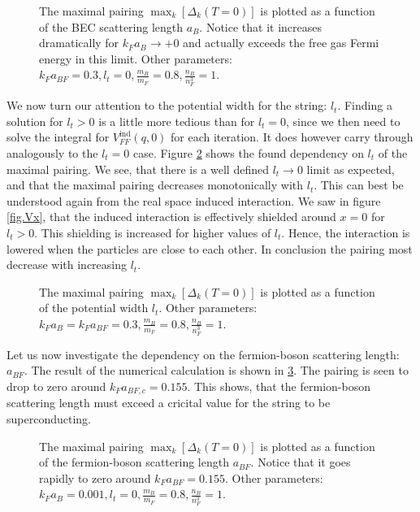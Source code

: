 \begin{figure} 
\begin{center}  
  
\caption{The maximal pairing $\max_k[\Delta_k(T=0)]$ is plotted as a function of the BEC scattering length $a_B$. Notice that it increases dramatically for $k_Fa_B \to +0$ and actually exceeds the free gas Fermi energy in this limit. Other parameters: $k_F a_{BF} = 0.3, l_t = 0, \frac{m_B}{m_F} = 0.8, \frac{n_B}{n_F^3} = 1$.}  
\label{fig.maxkDeltakaBdepend}  
\end{center}    
\end{figure}


 We now turn our attention to the potential width for the string: $l_t$. Finding a solution for $l_t > 0$ is a little more tedious than for $l_t = 0$, since we then need to solve the integral for $V_{FF}^\text{ind}(q,0)$ for each iteration. It does however carry through analogously to the $l_t = 0$ case. Figure \ref{fig.maxkDeltakltdepend} shows the found dependency on $l_t$ of the maximal pairing. We see, that there is a well defined $l_t \to 0$ limit as expected, and that the maximal pairing decreases monotonically with $l_t$. This can best be understood again from the real space induced interaction. We saw in figure \ref{fig.Vx}, that the induced interaction is effectively shielded around $x = 0$ for $l_t > 0$. This shielding is increased for higher values of $l_t$. Hence, the interaction is lowered when the particles are close to each other. In conclusion the pairing most decrease with increasing $l_t$. 

\begin{figure} 
\begin{center}  
  
\caption{The maximal pairing $\max_k[\Delta_k(T=0)]$ is plotted as a function of the potential width $l_t$. Other parameters: $k_Fa_B = k_F a_{BF} = 0.3, \frac{m_B}{m_F} = 0.8, \frac{n_B}{n_F^3} = 1$.}  
\label{fig.maxkDeltakltdepend}  
\end{center}    
\end{figure}

Let us now investigate the dependency on the fermion-boson scattering length: $a_{BF}$. The result of the numerical calculation is shown in \ref{fig.maxkDeltakaBFdepend}. The pairing is seen to drop to zero around $k_Fa_{BF,c} = 0.155$. This shows, that the fermion-boson scattering length must exceed a cricital value for the string to be superconducting.   

\begin{figure} 
\begin{center}  
  
\caption{The maximal pairing $\max_k[\Delta_k(T=0)]$ is plotted as a function of the fermion-boson scattering length $a_{BF}$. Notice that it goes rapidly to zero around $k_Fa_{BF} = 0.155$. Other parameters: $k_F a_{B} = 0.001, l_t = 0, \frac{m_B}{m_F} = 0.8, \frac{n_B}{n_F^3} = 1$.}  
\label{fig.maxkDeltakaBFdepend}  
\end{center}    
\end{figure}

